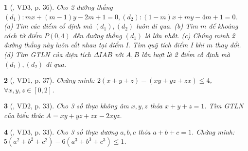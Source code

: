 \documentclass{article}
\newtheorem{baitoan}{}
\begin{document}
\begin{baitoan}[\cite{Kien_dai_so_9}, VD3, p. 36]
	Cho 2 đường thẳng $(d_1):mx + (m - 1)y - 2m + 1 = 0,(d_2):(1 - m)x + my - 4m + 1 = 0$. (a) Tìm các điểm cố định mà $(d_1),(d_2)$ luôn đi qua. (b) Tìm $m$ để khoảng cách từ điểm $P(0,4)$ đến đường thẳng $(d_1)$ là lớn nhất. (c) Chứng minh 2 đường thẳng này luôn cắt nhau tại điểm I. Tìm quỹ tích điểm I khi $m$ thay đổi. (d) Tìm {\rm GTLN} của diện tích $\Delta IAB$ với $A,B$ lần lượt là 2 điểm cố định mà $(d_1),(d_2)$ đi qua.
\end{baitoan}

\begin{baitoan}[\cite{Kien_dai_so_9}, VD1, p. 37]
	Chứng minh: $2(x + y + z) - (xy + yz + zx)\le4$, $\forall x,y,z\in[0,2]$.
\end{baitoan}

\begin{baitoan}[\cite{Kien_dai_so_9}, VD2, p. 33]
	Cho 3 số thực không âm $x,y,z$ thỏa $x + y + z = 1$. Tìm {\rm GTLN} của biểu thức $A = xy + yz + zx - 2xyz$.
\end{baitoan}

\begin{baitoan}[\cite{Kien_dai_so_9}, VD3, p. 33]
	Cho 3 số thực dương $a,b,c$ thỏa $a + b + c = 1$. Chứng minh: $5(a^2 + b^2 + c^2) - 6(a^3 + b^3 + c^3)\le1$.
\end{baitoan}


\printbibliography[heading=bibintoc]
	
\end{document}
